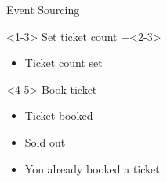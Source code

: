 \begin{frame}[fragile]{Event Sourcing}
\begin{minipage}{.7\textwidth}
\begin{onlyenv}
\end{onlyenv}
\end{minipage} \hfill
\begin{minipage}{0.25\textwidth}
\small
\begin{onlyenv}<1-3>
Set ticket count
\onslide+<2-3>
\begin{itemize}
\item Ticket count set
\end{itemize}
\end{onlyenv}
\begin{onlyenv}<4-5>
Book ticket
\begin{itemize}
\item Ticket booked
\item Sold out
\item You already booked a ticket
\end{itemize}
\end{onlyenv}
\end{minipage}

\end{frame}

